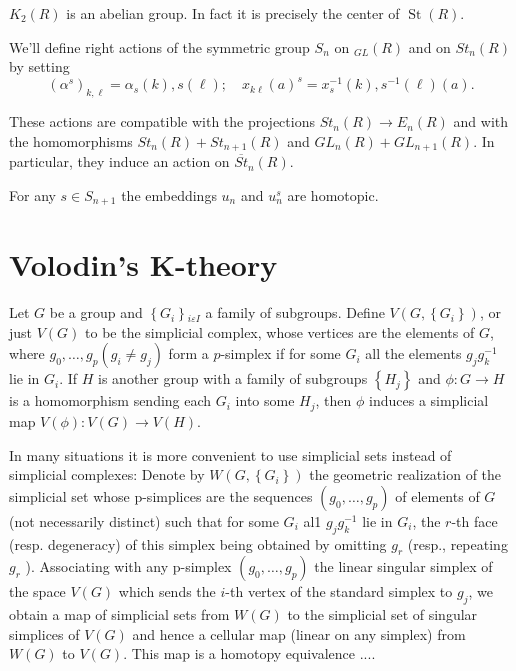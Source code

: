 \begin{theo}
$K_2(R)$ is an abelian group. In fact it is precisely the center of $\operatorname{St}(R)$.
\end{theo}

We'll define right actions of the symmetric group $S_n$ on ${ }_{G L}(R)$ and on $S t_n(R)$ by setting
$$
\left(\alpha^s\right)_{k, \ell}=\alpha_s(k), s(\ell) ; \quad x_{k \ell}(a)^s=x_s^{-1}(k), s^{-1}(\ell)(a) .
$$

These actions are compatible with the projections $S t_n(R) \rightarrow E_n(R)$ and with the homomorphisms $S t_n(R)+S t_{n+1}(R)$ and $G L_n(R)+G L_{n+1}(R)$. In particular, they induce an action on $\overline{S t}_n(R)$.

\begin{lemm}
    For any $s \in S_{n+1}$ the embeddings $u_n$ and $u_n^s$ are homotopic.
\end{lemm} 



\section{Volodin's K-theory}

Let $G$ be a group and $\left\{G_i\right\}{ }_{i \varepsilon I}$ a family of subgroups. Define $V\left(G,\left\{G_i\right\}\right)$, or just $V(G)$ to be the simplicial complex, whose vertices are the elements of $G$, where $g_0, \ldots, g_p\left(g_i \neq g_j\right)$ form a $p$-simplex if for some $G_i$ all the elements $g_j g_k^{-1}$ lie in $G_i$. If $H$ is another group with a family of subgroups $\left\{H_j\right\}$ and $\phi: G \rightarrow H$ is a homomorphism sending each $G_i$ into some $H_j$, then $\phi$ induces a simplicial map $V(\phi): V(G) \rightarrow V(H)$.

In many situations it is more convenient to use simplicial sets instead of simplicial complexes: Denote by $W\left(G,\left\{G_i\right\}\right)$ the geometric realization of the simplicial set whose p-simplices are the sequences $\left(g_0, \ldots, g_p\right)$ of elements of $G$ (not necessarily distinct) such that for some $G_i$ al1 $g_j g_k^{-1}$ lie in $G_i$, the $r$-th face (resp. degeneracy) of this simplex being obtained by omitting $g_r$ (resp., repeating $g_r$ ). Associating with any p-simplex $\left(g_0, \ldots, g_p\right)$ the linear singular simplex of the space $V(G)$ which sends the $i$-th vertex of the standard simplex to $g_j$, we obtain a map of simplicial sets from $W(G)$ to the simplicial set of singular simplices of $V(G)$ and hence a cellular map (linear on any simplex) from $W(G)$ to $V(G)$. This map is a homotopy equivalence .... %

